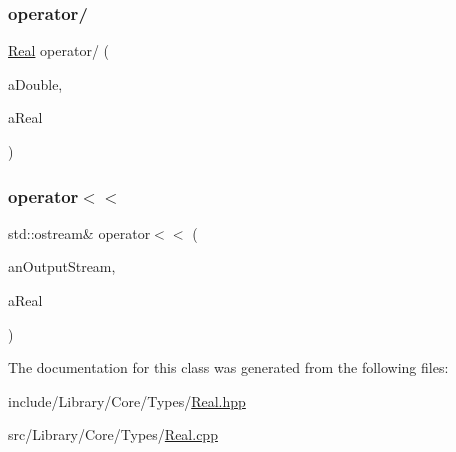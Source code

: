 \subsubsection{\texorpdfstring{operator/}{operator/}}
{\footnotesize\ttfamily \mbox{\hyperlink{classlibrary_1_1core_1_1types_1_1_real}{Real}} operator/ (\begin{DoxyParamCaption}\item[{const \mbox{\hyperlink{classlibrary_1_1core_1_1types_1_1_real_a9c5c8826b7e5a8e39544d23fea6c0e1c}{Real\+::\+Value\+Type}} \&}]{a\+Double,  }\item[{const \mbox{\hyperlink{classlibrary_1_1core_1_1types_1_1_real}{Real}} \&}]{a\+Real }\end{DoxyParamCaption})\hspace{0.3cm}{\ttfamily [friend]}}

\mbox{\label{classlibrary_1_1core_1_1types_1_1_real_a36816b0e006fd2ec3b0c53406439c7c3}} 
\subsubsection{\texorpdfstring{operator$<$$<$}{operator<<}}
{\footnotesize\ttfamily std\+::ostream\& operator$<$$<$ (\begin{DoxyParamCaption}\item[{std\+::ostream \&}]{an\+Output\+Stream,  }\item[{const \mbox{\hyperlink{classlibrary_1_1core_1_1types_1_1_real}{Real}} \&}]{a\+Real }\end{DoxyParamCaption})\hspace{0.3cm}{\ttfamily [friend]}}



The documentation for this class was generated from the following files\+:\begin{DoxyCompactItemize}
\item 
include/\+Library/\+Core/\+Types/\mbox{\hyperlink{_real_8hpp}{Real.\+hpp}}\item 
src/\+Library/\+Core/\+Types/\mbox{\hyperlink{_real_8cpp}{Real.\+cpp}}\end{DoxyCompactItemize}
